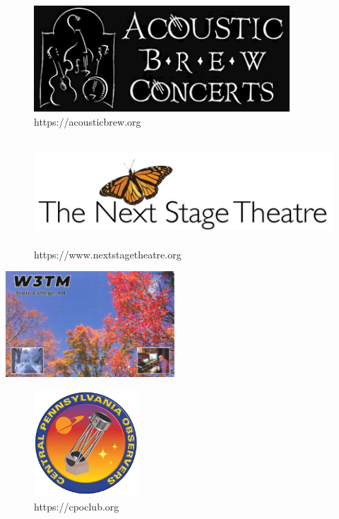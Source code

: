 \documentclass[
  letterpaper,
  DIV=11,
  numbers=noendperiod]{scrartcl}
\begin{document}
\begin{figure}[H]

{\centering \includegraphics[width=\linewidth,height=1.5625in,keepaspectratio]{wk01-2025-01-16_files/mediabag/Acoustic-Brew-logo.jpg}

}

\caption{https://acousticbrew.org}

\end{figure}%
\begin{figure}[H]

{\centering \includegraphics[width=\linewidth,height=1.5625in,keepaspectratio]{img_gilmore_bio/next-stage-logo.jpg}

}

\caption{https://www.nextstagetheatre.org}

\end{figure}%

\begin{center}
\includegraphics[width=\linewidth,height=1.5625in,keepaspectratio]{wk01-2025-01-16_files/mediabag/w3tm-qsl.png}
\end{center}

\begin{figure}[H]

{\centering \includegraphics[width=\linewidth,height=1.5625in,keepaspectratio]{../include/img/cpo-logo.jpg}

}

\caption{https://cpoclub.org}

\end{figure}%
\end{document}
